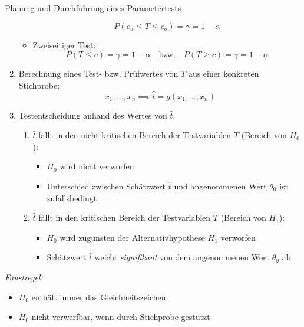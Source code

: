 \begin{algo}{Planung und Durchführung eines Parametertests}
\begin{enumerate}
\begin{itemize}
                        \[
                            P(c_u \leq T \leq c_o) = \gamma = 1 - \alpha
                        \]
                  \item Zweiseitiger Test:
                        \[
                            P(T \leq c) = \gamma = 1 - \alpha \quad \text{bzw.} \quad P(T \geq c) = \gamma = 1 - \alpha
                        \]
              \end{itemize}
        \item Berechnung eines Test- bzw. Prüfwertes von $T$ aus einer konkreten Stichprobe:
              \[
                  x_1, \ldots, x_n  \implies \hat{t} = g(x_1, \ldots, x_n)
              \]
        \item Testentscheidung anhand des Wertes von $\hat{t}$:
              \begin{enumerate}
                  \item $\hat{t}$ fällt in den nicht-kritischen Bereich der Testvariablen $T$ (Bereich von $H_0$):
                        \begin{itemize}
                            \item $H_0$ wird nicht verworfen
                            \item Unterschied zwischen Schätzwert $\hat{t}$ und angenommenen Wert $\theta_0$ ist zufallsbedingt.
                        \end{itemize}
                  \item $\hat{t}$ fällt in den kritischen Bereich der Testvariablen $T$ (Bereich von $H_1$):
                        \begin{itemize}
                            \item $H_0$ wird zugunsten der Alternativhypothese $H_1$ verworfen
                            \item Schätzwert $\hat{t}$ weicht \emph{signifikant} von dem angenommenen Wert $\theta_0$ ab.
                        \end{itemize}
              \end{enumerate}
    \end{enumerate}

    \emph{Faustregel:}
    \begin{itemize}
        \item $H_0$ enthält immer das Gleichheitszeichen
        \item $H_0$ nicht verwerfbar, wenn durch Stichprobe gestützt
    \end{itemize}
\end{algo}

